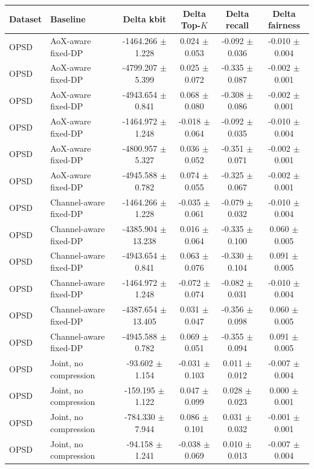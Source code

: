\begin{tabular}{llcccc}
\toprule
Dataset & Baseline & Delta kbit & Delta Top-$K$ & Delta recall & Delta fairness \\
\midrule
OPSD & AoX-aware fixed-DP & -1464.266 $\pm$ 1.228 & 0.024 $\pm$ 0.053 & -0.092 $\pm$ 0.036 & -0.010 $\pm$ 0.004 \\
OPSD & AoX-aware fixed-DP & -4799.207 $\pm$ 5.399 & 0.025 $\pm$ 0.072 & -0.335 $\pm$ 0.087 & -0.002 $\pm$ 0.001 \\
OPSD & AoX-aware fixed-DP & -4943.654 $\pm$ 0.841 & 0.068 $\pm$ 0.080 & -0.308 $\pm$ 0.086 & -0.002 $\pm$ 0.001 \\
OPSD & AoX-aware fixed-DP & -1464.972 $\pm$ 1.248 & -0.018 $\pm$ 0.064 & -0.092 $\pm$ 0.035 & -0.010 $\pm$ 0.004 \\
OPSD & AoX-aware fixed-DP & -4800.957 $\pm$ 5.327 & 0.036 $\pm$ 0.052 & -0.351 $\pm$ 0.071 & -0.002 $\pm$ 0.001 \\
OPSD & AoX-aware fixed-DP & -4945.588 $\pm$ 0.782 & 0.074 $\pm$ 0.055 & -0.325 $\pm$ 0.067 & -0.002 $\pm$ 0.001 \\
OPSD & Channel-aware fixed-DP & -1464.266 $\pm$ 1.228 & -0.035 $\pm$ 0.061 & -0.079 $\pm$ 0.032 & -0.010 $\pm$ 0.004 \\
OPSD & Channel-aware fixed-DP & -4385.904 $\pm$ 13.238 & 0.016 $\pm$ 0.064 & -0.335 $\pm$ 0.100 & 0.060 $\pm$ 0.005 \\
OPSD & Channel-aware fixed-DP & -4943.654 $\pm$ 0.841 & 0.063 $\pm$ 0.076 & -0.330 $\pm$ 0.104 & 0.091 $\pm$ 0.005 \\
OPSD & Channel-aware fixed-DP & -1464.972 $\pm$ 1.248 & -0.072 $\pm$ 0.074 & -0.082 $\pm$ 0.031 & -0.010 $\pm$ 0.004 \\
OPSD & Channel-aware fixed-DP & -4387.654 $\pm$ 13.405 & 0.031 $\pm$ 0.047 & -0.356 $\pm$ 0.098 & 0.060 $\pm$ 0.005 \\
OPSD & Channel-aware fixed-DP & -4945.588 $\pm$ 0.782 & 0.069 $\pm$ 0.051 & -0.355 $\pm$ 0.094 & 0.091 $\pm$ 0.005 \\
OPSD & Joint, no compression & -93.602 $\pm$ 1.154 & -0.031 $\pm$ 0.103 & 0.011 $\pm$ 0.012 & -0.007 $\pm$ 0.004 \\
OPSD & Joint, no compression & -159.195 $\pm$ 1.122 & 0.047 $\pm$ 0.099 & 0.028 $\pm$ 0.023 & 0.000 $\pm$ 0.001 \\
OPSD & Joint, no compression & -784.330 $\pm$ 7.944 & 0.086 $\pm$ 0.101 & 0.031 $\pm$ 0.032 & -0.001 $\pm$ 0.001 \\
OPSD & Joint, no compression & -94.158 $\pm$ 1.241 & -0.038 $\pm$ 0.069 & 0.010 $\pm$ 0.013 & -0.007 $\pm$ 0.004 \\

\end{tabular}
